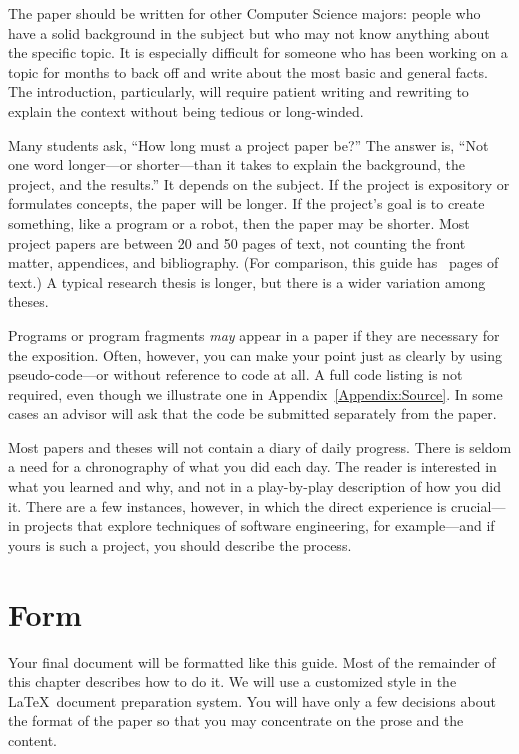 \documentclass[finalcopy]{srpaper}
\def\hyperref[#1]{}
\let\plainref\ref
\let\plainpageref\pageref
\newcommand{\plainref}{\ref*}
\newcommand{\plainpageref}{\pageref*}
\newcommand{\namedref}[2]{\hyperref[#2]{#1~\plainref{#2}}}
\begin{document}
The paper should be written for other Computer Science
majors: people who have a solid background in the subject
but who may not know anything about the specific topic. It
is especially difficult for someone who has been working on
a topic for months to back off and write about the most
basic and general facts. The introduction, particularly,
will require patient writing and rewriting to explain the
context without being tedious or long-winded.

Many students ask, ``How long must a project paper be?''%
 The
answer is, ``Not one word longer---or shorter---than it
takes to explain the background, the project, and the
results.'' It depends on the subject. If the project is
expository or formulates concepts, the paper will be
longer. If the project's goal is to create something, like a
program or a robot, then the paper may be shorter. Most
project papers are between 20 and 50 pages of text, not
counting the front matter, appendices, and
bibliography. (For comparison, this guide has
\plainpageref{EndOfText}~pages of text.) A typical research
thesis is longer, but there is a wider variation among
theses.

Programs or program fragments \emph{may} appear in a paper
if they are necessary for the exposition. Often, however,
you can make your point just as clearly by using
pseudo-code---or without reference to code at all.  A full
code listing is not required, even though we illustrate one
in \namedref{Appendix}{Appendix:Source}.  In some cases an
advisor will ask that the code be submitted separately from
the paper.

Most papers and theses will not contain a diary of daily
progress.  There is seldom a need for a chronography of what
you did each day. The reader is interested in what you
learned and why, and not in a play-by-play description of
how you did it. There are a few instances, however, in which
the direct experience is crucial---in projects that explore
techniques of software engineering, for example---and if
yours is such a project, you should describe the process.


\section{Form}
\label{Section:Form}
Your final document will be formatted like this guide. Most
of the remainder of this chapter describes how to do it. We
will use a customized style in the \LaTeX\ document
preparation system. You will have only a few decisions about
the format of the paper so that you may concentrate on the
prose and the
content.
\end{document}
